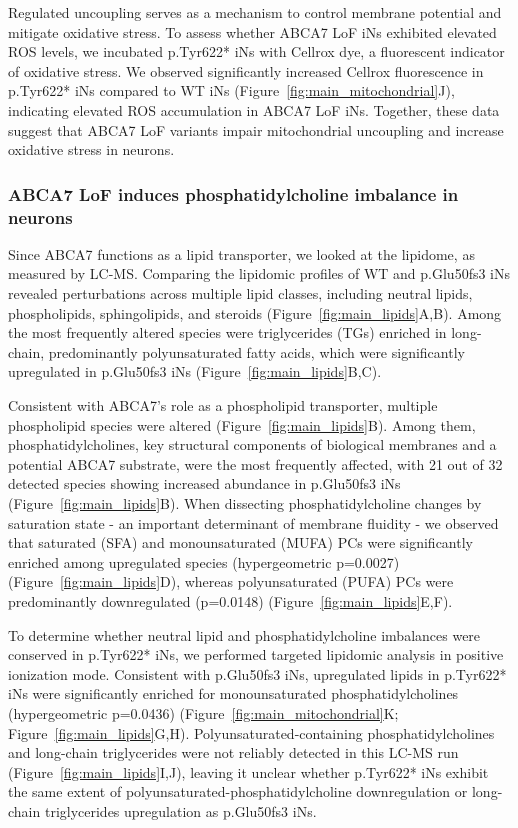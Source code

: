 Regulated uncoupling serves as a mechanism to control membrane potential and mitigate oxidative stress. To assess whether ABCA7 LoF iNs exhibited elevated ROS levels, we incubated p.Tyr622* iNs with Cellrox dye, a fluorescent indicator of oxidative stress. We observed significantly increased Cellrox fluorescence in p.Tyr622* iNs compared to WT iNs (Figure~\ref{fig:main_mitochondrial}J), indicating elevated ROS accumulation in ABCA7 LoF iNs. Together, these data suggest that ABCA7 LoF variants impair mitochondrial uncoupling and increase oxidative stress in neurons.

\subsubsection{ABCA7 LoF induces phosphatidylcholine imbalance in neurons}
Since ABCA7 functions as a lipid transporter, we looked at the lipidome, as measured by LC-MS. Comparing the lipidomic profiles of WT and p.Glu50fs3 iNs revealed perturbations across multiple lipid classes, including neutral lipids, phospholipids, sphingolipids, and steroids (Figure~\ref{fig:main_lipids}A,B). Among the most frequently altered species were triglycerides (TGs) enriched in long-chain, predominantly polyunsaturated fatty acids, which were significantly upregulated in p.Glu50fs3 iNs (Figure~\ref{fig:main_lipids}B,C). 

Consistent with ABCA7's role as a phospholipid transporter, multiple phospholipid species were altered (Figure~\ref{fig:main_lipids}B). Among them, phosphatidylcholines, key structural components of biological membranes and a potential ABCA7 substrate, were the most frequently affected, with 21 out of 32 detected species showing increased abundance in p.Glu50fs3 iNs (Figure~\ref{fig:main_lipids}B). When dissecting phosphatidylcholine changes by saturation state - an important determinant of membrane fluidity - we observed that saturated (SFA) and monounsaturated (MUFA) PCs were significantly enriched among upregulated species (hypergeometric p=0.0027) (Figure~\ref{fig:main_lipids}D), whereas polyunsaturated (PUFA) PCs were predominantly downregulated (p=0.0148) (Figure~\ref{fig:main_lipids}E,F).

To determine whether neutral lipid and phosphatidylcholine imbalances were conserved in p.Tyr622* iNs, we performed targeted lipidomic analysis in positive ionization mode. Consistent with p.Glu50fs3 iNs, upregulated lipids in p.Tyr622* iNs were significantly enriched for monounsaturated phosphatidylcholines (hypergeometric p=0.0436) (Figure~\ref{fig:main_mitochondrial}K; Figure~\ref{fig:main_lipids}G,H). Polyunsaturated-containing phosphatidylcholines and long-chain triglycerides were not reliably detected in this LC-MS run (Figure~\ref{fig:main_lipids}I,J), leaving it unclear whether p.Tyr622* iNs exhibit the same extent of polyunsaturated-phosphatidylcholine downregulation or long-chain triglycerides upregulation as p.Glu50fs3 iNs.

